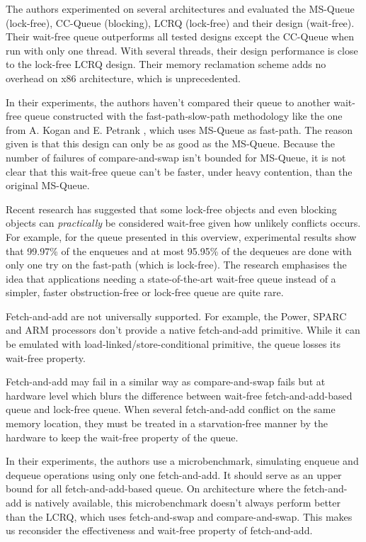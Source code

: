 


The authors experimented on several architectures and evaluated the MS-Queue
(lock-free), CC-Queue (blocking), LCRQ (lock-free) and their design (wait-free).
Their wait-free queue outperforms all tested designs except the CC-Queue when
run with only one thread. With several threads, their design performance is
close to the lock-free LCRQ design. Their memory reclamation scheme adds no
overhead on x86 architecture, which is unprecedented.

In their experiments, the authors haven't compared their queue to another
wait-free queue constructed with the fast-path-slow-path methodology like the
one from A. Kogan and E. Petrank \cite{Kogan:2012:MCF:2370036.2145835}, which
uses MS-Queue as fast-path. The reason given is that this design can only be as
good as the MS-Queue. Because the number of failures of compare-and-swap isn't
bounded for MS-Queue, it is not clear that this wait-free queue can't be faster,
under heavy contention, than the original MS-Queue.

Recent research has suggested that some lock-free objects
\cite{Alistarh:2016:LCA:2997039.2903136} and even blocking objects
\cite{David:2016:CSD:2935764.2935774} can \textit{practically} be considered
wait-free given how unlikely conflicts occurs. For example, for the queue
presented in this overview, experimental results show that 99.97\% of the
enqueues and at most 95.95\% of the dequeues are done with only one try on the
fast-path (which is lock-free). The research emphasises the idea that
applications needing a state-of-the-art wait-free queue instead of a simpler,
faster obstruction-free or lock-free queue are quite rare.

Fetch-and-add are not universally supported. For example, the Power, SPARC and
ARM processors don't provide a native fetch-and-add primitive. While it can be
emulated with load-linked/store-conditional primitive, the queue losses its
wait-free property.

Fetch-and-add may fail in a similar way as compare-and-swap fails but at
hardware level which blurs the difference between wait-free fetch-and-add-based
queue and lock-free queue. When several fetch-and-add conflict on the same
memory location, they must be treated in a starvation-free manner by the
hardware to keep the wait-free property of the queue.

In their experiments, the authors use a microbenchmark, simulating enqueue and
dequeue operations using only one fetch-and-add. It should serve as an upper
bound for all fetch-and-add-based queue. On architecture where the fetch-and-add
is natively available, this microbenchmark doesn't always perform better than
the LCRQ, which uses fetch-and-swap and compare-and-swap. This makes us
reconsider the effectiveness and wait-free property of fetch-and-add.
